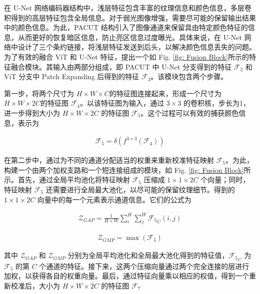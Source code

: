 \documentclass[a4paper]{ctexart}
\begin{document}
	在 U-Net 网络编码器结构中，浅层特征包含丰富的纹理信息和颜色信息，多层卷积得到的高层特征包含全局信息。对于弱光图像增强，需要尽可能的保留输出结果中的颜色信息。为此，PACUT 结构引入了图像通道来保留具由特定颜色特征的信息，从而更好的恢复暗区信息，防止亮区信息过度曝光。具体来说，在 U-Net 网络中设计了三个条约链接，将浅层特征发送到后头，以解决颜色信息丢失的问题。为了有效的融合 ViT 和 U-Net 特征，提出一个如 Fig. \ref{fig: Fusion Block}所示的特征融合模块。其输入由两部分组成，即 PACUT 中 U-Net 分支得到的特征 $\mathcal{F_2}$ 和 ViT 分支中 Patch Expanding 后得到的特征 $\mathcal{F_3}$。该模块包含两个步骤。
	
	第一步，将两个尺寸为 $H \times W \times C$的特征图连接起来，形成一个尺寸为 $H \times W \times 2C$的特征图 $\mathcal{F}_4$。以该特征图为输入，通过 $3 \times 3$ 的卷积核，步长为1，进一步得到大小为 $H \times W \times 2C$ 的特征图 $\mathcal{F}_5$。这个过程可以有效的捕获颜色信息，表示为 
	
	\begin{equation}
		\begin{aligned}
			\mathcal{F}_5 = \delta \left( f^{3 \times 3} (\mathcal{F}_4)\right)
		\end{aligned}
		\label{eq: capture color information}
	\end{equation}
	
	在第二步中，通过为不同的通道分配适当的权重来重新校准特征映射 $\mathcal{F}_5$。为此，构建一个由两个加权支路和一个短连接组成的模块，如 Fig. \ref{fig: Fusion Block}所示。首先，通过全局平均池化将特征映射 $\mathcal{F}_5$ 压缩成 $1 \times 1 \times 2C$ 个向量；同时，特征映射 $\mathcal{F}_5$ 还需要进行全局最大池化，以尽可能的保留纹理细节。得到的 $1 \times 1 \times 2C$ 向量中的每一个元素表示通道信息。它们的公式为
	
	\begin{equation}
		\begin{aligned}
			\mathcal{Z}_{GAP} = \frac{1}{H \times W} \sum_{i}^{H} \sum_{j}^{W} {\mathcal{F}_5}_C (i,j)
		\end{aligned}
		\label{eq: avgpool}
	\end{equation}
	
	\begin{equation}
		\begin{aligned}
			\mathcal{Z}_{GMP} = \max \left( \mathcal{F}_5 \right)
		\end{aligned}
		\label{eq: maxpool}
	\end{equation}
	
	其中 $\mathcal{Z}_{GAP}$ 和 $\mathcal{Z}_{GMP}$ 分别为全局平均池化和全局最大池化得到的特征值，${\mathcal{F}_5}_C$ 为 $\mathcal{F}_5$ 的第 $C$ 个通道的特征。接下来，这两个压缩向量通过两个完全连接的层进行加权，以获得各自的权重向量。最后，通过特征向量乘以相应的权值，得到一个重新校准后，大小为 $H \times W \times 2C$ 的特征图 $\mathcal{F}_7$
	
\end{document}
